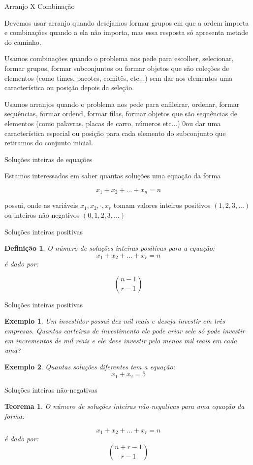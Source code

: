 \documentclass{beamer}
\newtheorem{teorema}{Teorema}
\newtheorem{exemplo}{Exemplo}
\newtheorem{definicao}{Definição}
\begin{document}
\begin{frame}{Arranjo X Combinação}

Devemos usar arranjo quando desejamos formar grupos em que a ordem importa e combinações quando a ela não importa, mas essa resposta só apresenta metade do caminho. 

\vspace{3px}
\pause

Usamos combinações quando o problema nos pede para escolher, selecionar, formar grupos, formar subconjuntos ou formar objetos que são coleções de elementos (como times, pacotes, comitês, etc...) sem dar aos elementos uma característica ou posição depois da seleção.

\vspace{3px}
\pause

Usamos arranjos quando o problema nos pede para enfileirar, ordenar, formar sequências, formar ordend, formar filas, formar objetos que são sequências de elementos (como palavras, placas de carro, números etc...) 0ou dar uma característica especial ou posição para cada elemento do subconjunto que retiramos do conjunto inicial. 
    
\end{frame}

\begin{frame}{Soluções inteiras de equações}

Estamos interessados em saber quantas soluções uma equação da forma

$$x_1 + x_2 + \dots + x_n = n$$

possui, onde as variáveis $x_1, x_2, \cdot, x_r$ tomam valores inteiros positivos $(1,2,3,\dots)$ ou inteiros não-negativos $(0,1,2,3,\dots)$
\end{frame}

\begin{frame}{Soluções inteiras positivas}

\begin{definicao}
    O número de soluções inteiras positivas para a equação:
    $$x_1 + x_2 + \dots + x_r = n$$
    é dado por:

    $$\binom{n-1}{r-1}$$
\end{definicao}
\end{frame}

\begin{frame}{Soluções inteiras positivas}

\begin{exemplo}
    Um investidor possui dez mil reais e deseja investir em três empresas. Quantas carteiras de investimento ele pode criar sele só pode investir em incrementos de mil reais e ele deve investir pelo menos mil reais em cada uma?
\end{exemplo}

\pause

\begin{exemplo}
    Quantas soluções diferentes tem a equação:
    $$x_1 + x_2 = 5$$
\end{exemplo}
\end{frame}

\begin{frame}{Soluções inteiras não-negativas}
    \begin{teorema}
        O número de soluções inteiras não-negativas para uma equação da forma:

        $$x_1+x_2+\dots+x_r = n$$
        é dado por:
        $$\binom{n+r-1}{r-1}$$
    \end{teorema}
\end{frame}
\end{document}
